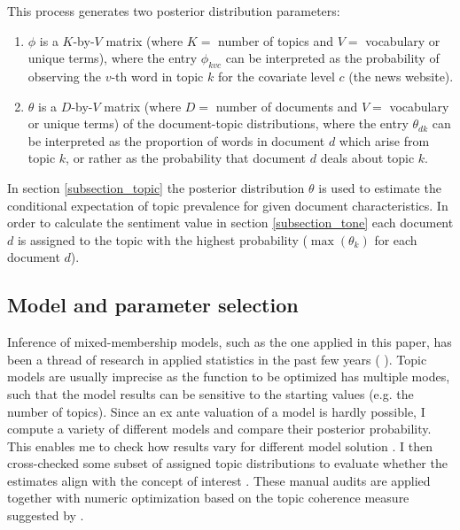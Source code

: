 \documentclass[12pt,a4paper,notitlepage]{article}
\begin{document}
This process generates two posterior distribution parameters: 

\begin{enumerate}
	\item $\phi$ is a $K$-by-$V$ matrix (where $K=$ number of topics and $V=$ vocabulary or unique terms), where the entry $\phi_{kvc}$ can be interpreted as the probability of observing the $v$-th word in topic $k$ for the covariate level $c$ (the news website). 
	\item $\theta$ is a $D$-by-$V$ matrix (where $D=$ number of documents and $V=$ vocabulary or unique terms) of the document-topic distributions, where the entry $\theta_{dk}$ can be interpreted as the proportion of words in document $d$ which arise from topic $k$, or rather as the probability that document $d$ deals about topic $k$. 
\end{enumerate}

In section \ref{subsection_topic} the posterior distribution $\theta$ is used to estimate the conditional expectation of topic prevalence for given document characteristics. In order to calculate the sentiment value in section \ref{subsection_tone} each document $d$ is assigned to the topic with the highest probability ($\max (\theta_{k})$ for each document $d$).

\subsection{Model and parameter selection}

Inference of mixed-membership models, such as the one applied in this paper, has been a thread of research in applied statistics in the past few years (\citet{blei_latent_2003} \citet{erosheva_mixed-membership_2004} \citet{braun_variational_2010}). Topic models are usually imprecise as the function to be optimized has multiple modes, such that the model results can be sensitive to the starting values (e.g. the number of topics). Since an ex ante valuation of a model is hardly possible, I compute a variety of different models and compare their posterior probability. This enables me to check how results vary for different model solution \citep{roberts_navigating_2016}. I then cross-checked some subset of assigned topic distributions to evaluate whether the estimates align with the concept of interest \citep{gentzkow_text_2017}. These manual audits are applied together with numeric optimization based on the topic coherence measure suggested by \citet{mimno_optimizing_2011}. 
\end{document}
